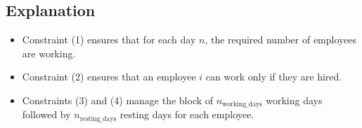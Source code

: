 \documentclass{article}
\begin{document}
\subsection*{Explanation}
\begin{itemize}
    \item Constraint (1) ensures that for each day \( n \), the required number of employees are working.
    \item Constraint (2) ensures that an employee \( i \) can work only if they are hired.
    \item Constraints (3) and (4) manage the block of \( n_{\text{working\_days}} \) working days followed by \( n_{\text{resting\_days}} \) resting days for each employee.
\end{itemize}
\end{document}
